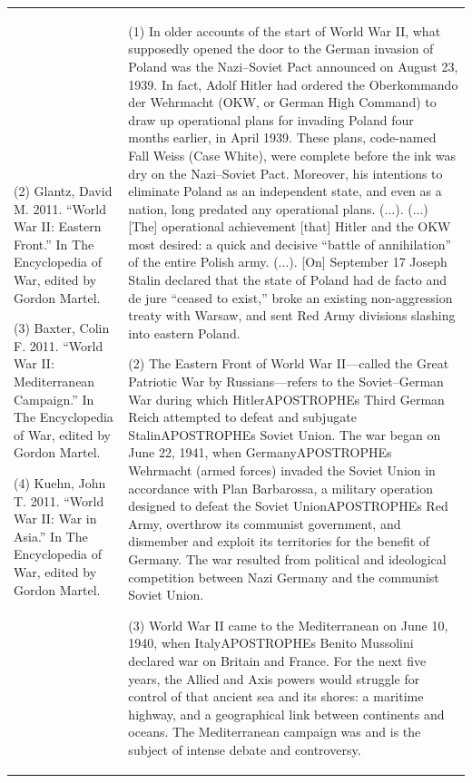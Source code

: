 {\begin{longtable}{p{}p{}}
(2) Glantz, David M. 2011. “World War II: Eastern Front.” In The Encyclopedia of War, edited by Gordon Martel.

(3) Baxter, Colin F. 2011. “World War II: Mediterranean Campaign.” In The Encyclopedia of War, edited by Gordon Martel.

(4) Kuehn, John T. 2011. “World War II: War in Asia.” In The Encyclopedia of War, edited by Gordon Martel. & (1) In older accounts of the start of World War II, what supposedly opened the door to the German invasion of Poland was the Nazi–Soviet Pact announced on August 23, 1939. In fact, Adolf Hitler had ordered the Oberkommando der Wehrmacht (OKW, or German High Command) to draw up operational plans for invading Poland four months earlier, in April 1939. These plans, code-named Fall Weiss (Case White), were complete before the ink was dry on the Nazi–Soviet Pact. Moreover, his intentions to eliminate Poland as an independent state, and even as a nation, long predated any operational plans. (...). (...) [The] operational achievement [that] Hitler and the OKW most desired: a quick and decisive “battle of annihilation” of the entire Polish army. (...). 
[On] September 17 Joseph Stalin declared that the state of Poland had de facto and de jure “ceased to exist,” broke an existing non-aggression treaty with Warsaw, and sent Red Army divisions slashing into eastern Poland.

(2) The Eastern Front of World War II—called the Great Patriotic War by Russians—refers to the Soviet–German War during which HitlerAPOSTROPHEs Third German Reich attempted to defeat and subjugate StalinAPOSTROPHEs Soviet Union. The war began on June 22, 1941, when GermanyAPOSTROPHEs Wehrmacht (armed forces) invaded the Soviet Union in accordance with Plan Barbarossa, a military operation designed to defeat the Soviet UnionAPOSTROPHEs Red Army, overthrow its communist government, and dismember and exploit its territories for the benefit of Germany. The war resulted from political and ideological competition between Nazi Germany and the communist Soviet Union.

(3) World War II came to the Mediterranean on June 10, 1940, when ItalyAPOSTROPHEs Benito Mussolini declared war on Britain and France. For the next five years, the Allied and Axis powers would struggle for control of that ancient sea and its shores: a maritime highway, and a geographical link between continents and oceans. The Mediterranean campaign was and is the subject of intense debate and controversy.


\end{longtable}}
